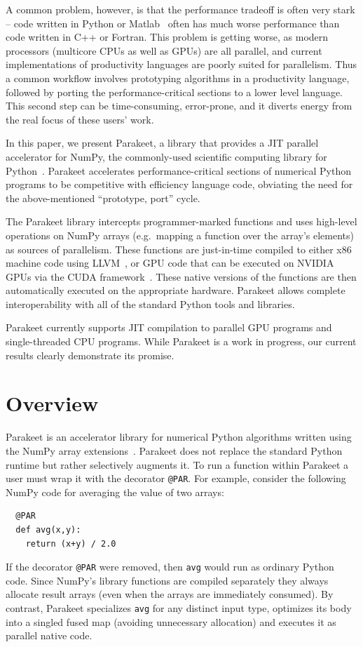 \documentclass[10pt,twocolumn]{article}
\begin{document}
A common problem, however, is that the performance tradeoff is often very stark -- code written in Python or Matlab~\cite{Moler80} often has much worse performance than code written in C++ or Fortran.  This problem is getting worse, as modern processors (multicore CPUs as well as GPUs) are all parallel, and current implementations of productivity languages are poorly suited for parallelism.  Thus a common workflow involves prototyping algorithms in a productivity language, followed by porting the performance-critical sections to a lower level language.  This second step can be time-consuming, error-prone, and it diverts energy from the real focus of these users' work.

In this paper, we present Parakeet, a library that provides a JIT parallel accelerator for NumPy, the commonly-used scientific computing library for Python~\cite{Oliphant07}. Parakeet accelerates performance-critical sections of numerical Python programs to be competitive with efficiency language code, obviating the need for the above-mentioned ``prototype, port'' cycle.

The Parakeet library intercepts programmer-marked functions and uses high-level operations on NumPy arrays (e.g.~mapping a function over the array's elements) as sources of parallelism. These functions are just-in-time compiled to either x86 machine code using LLVM~\cite{Latt02}, or GPU code that can be executed on NVIDIA GPUs via the CUDA framework~\cite{NvidCU}. These native versions of the functions are then automatically executed on the appropriate hardware. Parakeet allows complete interoperability with all of the standard Python tools and libraries.

Parakeet currently supports JIT compilation to parallel GPU programs and single-threaded CPU programs.  While Parakeet is a work in progress, our current results clearly demonstrate its promise.  

\section{Overview}
\label{overview}

Parakeet is an accelerator library for numerical Python algorithms written using the NumPy array extensions~\cite{Oliphant07}. Parakeet does not replace the standard Python runtime but rather selectively augments it. To run a function within Parakeet a user must wrap it with the decorator \lstinline{@PAR}. For example, consider the following NumPy code for averaging the value of two arrays: 
\begin{lstlisting}
  @PAR
  def avg(x,y):
    return (x+y) / 2.0
\end{lstlisting}
If the decorator \lstinline{@PAR} were removed, then \lstinline{avg} would run as ordinary Python code. Since NumPy's library functions are compiled separately they always allocate result arrays (even when the arrays are immediately consumed). By contrast, Parakeet specializes \lstinline{avg} for any distinct input type, optimizes its body into a singled fused map (avoiding unnecessary allocation) and executes it as parallel native code.
\end{document}
